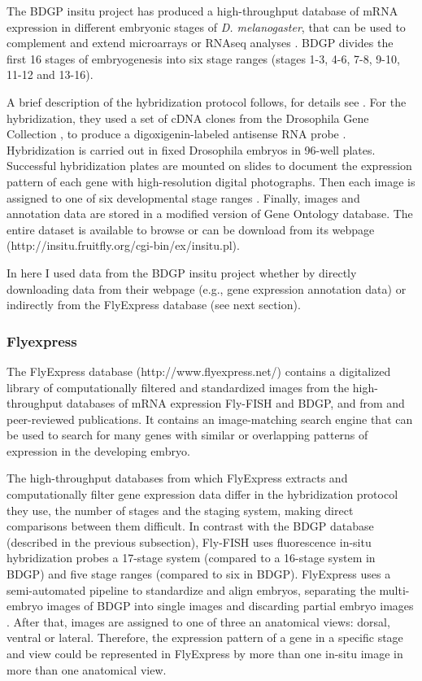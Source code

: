 The BDGP insitu project has produced a high-throughput database of mRNA expression in different embryonic stages of \textit{D. melanogaster}, that can be used to complement and extend microarrays or RNAseq analyses \citep{Tomancak2002}. 
BDGP divides the first 16 stages of embryogenesis into six stage ranges (stages 1-3, 4-6, 7-8, 9-10, 11-12 and 13-16).

A brief description of the hybridization protocol follows, for details see \citep{Tomancak2002}.
For the hybridization, they used a set of cDNA clones from the Drosophila Gene Collection \citep{Stapleton2002}, to produce a digoxigenin-labeled antisense RNA probe \citep{Tomancak2002}.
Hybridization is carried out in fixed Drosophila embryos in 96-well plates. Successful hybridization plates are mounted on slides to document the expression pattern of each gene with high-resolution digital photographs. Then each image is assigned to one of six developmental stage ranges \citep{Weiszmann2009a}.
%
Finally, images and annotation data are stored in a modified version of Gene Ontology database. The entire dataset is available to browse or can be download from its webpage (http://insitu.fruitfly.org/cgi-bin/ex/insitu.pl).

In here I used data from the BDGP insitu project whether by directly downloading data from their webpage (e.g., gene expression annotation data) or indirectly from the FlyExpress database (see next section). 

\subsubsection{Flyexpress}

The FlyExpress database (http://www.flyexpress.net/) contains a digitalized library of computationally filtered and standardized images from the high-throughput databases of mRNA expression Fly-FISH and BDGP, and from and peer-reviewed publications. It contains an image-matching search engine that can be used to search for many genes with similar or overlapping patterns of expression in the developing embryo.

The high-throughput databases from which FlyExpress extracts and computationally filter gene expression data differ in the hybridization protocol they use, the number of stages and the staging system, making direct comparisons between them difficult.
In contrast with the BDGP database (described in the previous subsection), Fly-FISH uses fluorescence in-situ hybridization probes \citep{Lecuyer2007} a 17-stage system (compared to a 16-stage system in BDGP) and five stage ranges (compared to six in BDGP).
FlyExpress uses a semi-automated pipeline to standardize and align embryos, separating the multi- embryo images of BDGP into single images and discarding partial embryo images \citep{Konikoff2012}. 
After that, images are assigned to one of three an anatomical views: dorsal, ventral or lateral. Therefore, the expression pattern of a gene in a specific stage and view could be represented in FlyExpress by more than one in-situ image in more than one anatomical view.


